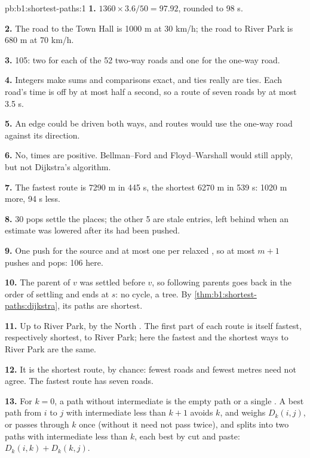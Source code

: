 \begin{solution}{pb:b1:shortest-paths:1}
\textbf{1.} $1360 \times 3.6 / 50 = 97.92$, rounded to 98 s.

\textbf{2.} The road to the Town Hall is 1000 m at 30 km/h; the road to River Park is 680 m at 70 km/h.

\textbf{3.} 105: two  for each of the 52 two-way roads and one for the one-way road.

\textbf{4.} Integers make sums and comparisons exact, and ties really are ties. Each road's time is off by at most half a
second, so a route of seven roads by at most 3.5 s.

\textbf{5.} An edge could be driven both ways, and routes would use the one-way road against its direction.

\textbf{6.} No, times are positive. Bellman--Ford and Floyd--Warshall would still apply, but not Dijkstra's algorithm.

\textbf{7.} The fastest route is 7290 m in 445 s, the shortest 6270 m in 539 s: 1020 m more, 94 s less.

\textbf{8.} 30 pops settle the places; the other 5 are stale entries, left behind when an estimate was lowered after
its  had been pushed.

\textbf{9.} One push for the source and at most one per relaxed , so at most $m + 1$ pushes and pops: 106 here.

\textbf{10.} The parent of $v$ was settled before $v$, so following parents goes back in the order of settling and ends
at $s$: no cycle, a tree. By \cref{thm:b1:shortest-paths:dijkstra}, its paths are shortest.

\textbf{11.} Up to River Park, by the North . The first part of each route is itself fastest, respectively shortest,
to River Park; here the fastest and the shortest ways to River Park are the same.

\textbf{12.} It is the shortest route, by chance: fewest roads and fewest metres need not agree. The fastest route has
seven roads.

\textbf{13.} For $k = 0$, a path without intermediate  is the empty path or a single . A best path from $i$ to $j$
with intermediate  less than $k + 1$ avoids $k$, and weighs $D_k(i, j)$, or passes through $k$ once (without
 it need not pass twice), and splits into two paths with intermediate  less than $k$, each best
by cut and paste: $D_k(i, k) + D_k(k, j)$.


\end{solution}
